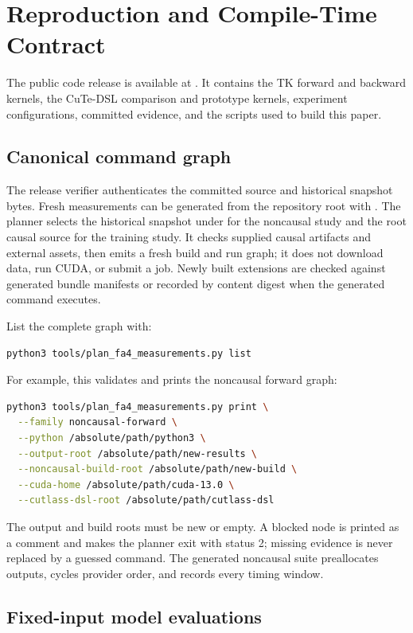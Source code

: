 \section{Reproduction and Compile-Time Contract}
\label{app:reproduction}

The public code release is available at \projectrepo. It contains the TK
forward and backward kernels, the CuTe-DSL comparison and prototype kernels,
experiment configurations, committed evidence, and the scripts used to build
this paper.

\subsection{Canonical command graph}

The release verifier authenticates the committed source and historical
snapshot bytes. Fresh measurements can be generated from the repository root with
. The planner selects the historical
snapshot under  for the
noncausal study and the root causal source for the training study. It checks
supplied causal artifacts and external assets, then emits a fresh build and run
graph; it does not download data, run CUDA, or submit a job. Newly built
extensions are checked against generated bundle manifests or recorded by
content digest when the generated command executes.

List the complete graph with:
\begin{lstlisting}[language=bash]
python3 tools/plan_fa4_measurements.py list
\end{lstlisting}
For example, this validates and prints the noncausal forward graph:
\begin{lstlisting}[language=bash]
python3 tools/plan_fa4_measurements.py print \
  --family noncausal-forward \
  --python /absolute/path/python3 \
  --output-root /absolute/path/new-results \
  --noncausal-build-root /absolute/path/new-build \
  --cuda-home /absolute/path/cuda-13.0 \
  --cutlass-dsl-root /absolute/path/cutlass-dsl
\end{lstlisting}
The output and build roots must be new or empty. A blocked node is printed as a
comment and makes the planner exit with status 2; missing evidence is never
replaced by a guessed command. The generated noncausal suite preallocates
outputs, cycles provider order, and records every timing window.

\subsection{Fixed-input model evaluations}

